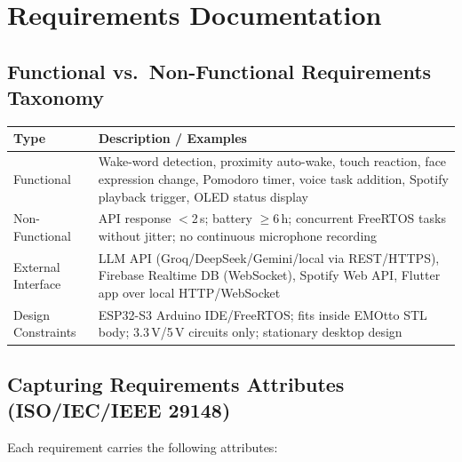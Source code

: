 \documentclass[12pt,a4paper]{article}
\begin{document}
\newpage
\section*{Requirements Documentation}

\subsection*{Functional vs.\ Non-Functional Requirements Taxonomy}

\begin{center}
\begin{tabular}{|L{0.25\textwidth}|L{0.63\textwidth}|}
\hline
\textbf{Type} & \textbf{Description / Examples} \\ \hline
Functional & Wake-word detection, proximity auto-wake, touch reaction,
             face expression change, Pomodoro timer, voice task addition,
             Spotify playback trigger, OLED status display \\ \hline
Non-Functional & API response $<$2\,s; battery $\geq$6\,h; concurrent
                 FreeRTOS tasks without jitter; no continuous microphone
                 recording \\ \hline
External Interface & LLM API (Groq/DeepSeek/Gemini/local via REST/HTTPS),
                     Firebase Realtime DB (WebSocket), Spotify Web API,
                     Flutter app over local HTTP/WebSocket \\ \hline
Design Constraints & ESP32-S3 Arduino IDE/FreeRTOS; fits inside EMOtto STL
                     body; 3.3\,V/5\,V circuits only; stationary desktop
                     design \\ \hline
\end{tabular}
\end{center}

\subsection*{Capturing Requirements Attributes (ISO/IEC/IEEE 29148)}

Each requirement carries the following attributes:
\end{document}

